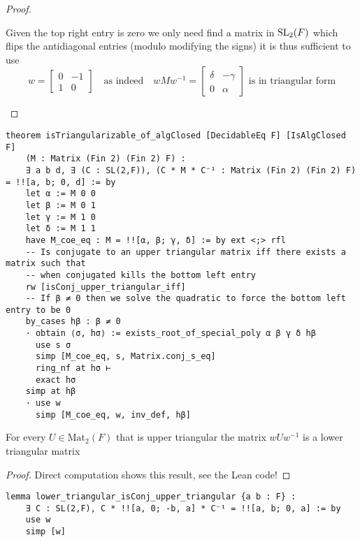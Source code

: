 \begin{proof}
\begin{itemize}
    Given the top right entry is zero we only need find a matrix in $\operatorname{SL}_2(F)$ which flips the antidiagonal entries (modulo modifying the signs)
    it is thus sufficient to use 
        \[
        w = \begin{bmatrix}
        0 & -1\\
        1 & 0
        \end{bmatrix} \quad \text{as indeed} \quad w M w^{-1} = \begin{bmatrix}
            \delta & -\gamma\\
            0 & \alpha
        \end{bmatrix} \text{ is in triangular form} 
        \]
\end{itemize}

\end{proof}
\begin{footnotesize}
\begin{verbatim}
theorem isTriangularizable_of_algClosed [DecidableEq F] [IsAlgClosed F]
    (M : Matrix (Fin 2) (Fin 2) F) :
    ∃ a b d, ∃ (C : SL(2,F)), (C * M * C⁻¹ : Matrix (Fin 2) (Fin 2) F) = !![a, b; 0, d] := by
    let α := M 0 0
    let β := M 0 1
    let γ := M 1 0
    let δ := M 1 1
    have M_coe_eq : M = !![α, β; γ, δ] := by ext <;> rfl
    -- Is conjugate to an upper triangular matrix iff there exists a matrix such that
    -- when conjugated kills the bottom left entry
    rw [isConj_upper_triangular_iff]
    -- If β ≠ 0 then we solve the quadratic to force the bottom left entry to be 0
    by_cases hβ : β ≠ 0
    · obtain ⟨σ, hσ⟩ := exists_root_of_special_poly α β γ δ hβ
      use s σ
      simp [M_coe_eq, s, Matrix.conj_s_eq]
      ring_nf at hσ ⊢
      exact hσ
    simp at hβ
    · use w
      simp [M_coe_eq, w, inv_def, hβ]
\end{verbatim}
\end{footnotesize}

\begin{corollary}
    \label{lower_triangular_isConj_upper_triangular}
    \leanok
    For every $U \in \textrm{Mat}_2(F)$ that is upper triangular the matrix $w U w^{-1}$ is a lower triangular matrix
\end{corollary}
\begin{proof}
    \leanok
    Direct computation shows this result, see the Lean code!
\end{proof}
\begin{footnotesize}
\begin{verbatim}
lemma lower_triangular_isConj_upper_triangular {a b : F} :
    ∃ C : SL(2,F), C * !![a, 0; -b, a] * C⁻¹ = !![a, b; 0, a] := by
    use w
    simp [w]
\end{verbatim}
\end{footnotesize}


